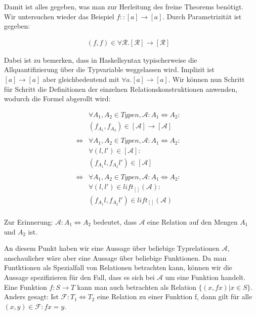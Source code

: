 Damit ist alles gegeben, was man zur Herleitung des freine Theorems benötigt. Wir untersuchen wieder das Beispiel
$f :: [a] \rightarrow [a]$. Durch Parametrizität ist gegeben:

\begin{align}
(f, f) \in \forall \mathcal{R} . [\mathcal{R}] \rightarrow [\mathcal{R}]
\end{align}

Dabei ist zu bemerken, dass in Haskellsyntax typischerweise die Allquantifizierung über die Typvariable weggelassen wird.
Implizit ist $[a] \rightarrow [a]$ aber gleichbedeutend mit $\forall a . [a] \rightarrow [a]$.
Wir können nun Schritt für Schritt die Definitionen der einzelnen Relationskonstruktionen anwenden, wodurch die Formel
abgerollt wird:

\begin{align*}
&\forall A_1, A_2 \in Typen, \mathcal{A} : A_1 \Leftrightarrow A_2: \\
&(f_{A_1}, f_{A_2}) \in [\mathcal{A}] \rightarrow [\mathcal{A}] \\
& \\
\Leftrightarrow &
\forall A_1, A_2 \in Typen, \mathcal{A} : A_1 \Leftrightarrow A_2: \\
& \forall (l, l') \in [\mathcal{A}]: \\
&(f_{A_1} l, f_{A_2} l') \in [\mathcal{A}] \\
& \\
\Leftrightarrow &
\forall A_1, A_2 \in Typen, \mathcal{A} : A_1 \Leftrightarrow A_2: \\
& \forall (l, l') \in lift_{[]}(\mathcal{A}): \\
& (f_{A_1} l, f_{A_2} l') \in lift_{[]}(\mathcal{A}) \\
\end{align*}

Zur Erinnerung: $\mathcal{A} : A_1 \Leftrightarrow A_2$ bedeutet, dass $\mathcal{A}$ eine Relation auf den Mengen $A_1$ und $A_2$ ist.

An diesem Punkt haben wir eine Aussage über beliebige Typrelationen $\mathcal{A}$, anschaulicher wäre aber eine Aussage
über beliebige Funktionen. Da man Funtktionen als Spezialfall von Relationen betrachten kann, können wir die Aussage
spezifizieren für den Fall, dass es sich bei $\mathcal{A}$ um eine Funktion handelt.
Eine Funktion $f : S \rightarrow T$ kann man auch betrachten als Relation $\{ (x, f x) | x \in S \}$. Anders gesagt: Ist
$\mathcal{F} : T_1 \Leftrightarrow T_2$ eine Relation zu einer Funktion f, dann gilt für alle $(x, y) \in \mathcal{F}: f x = y$.


